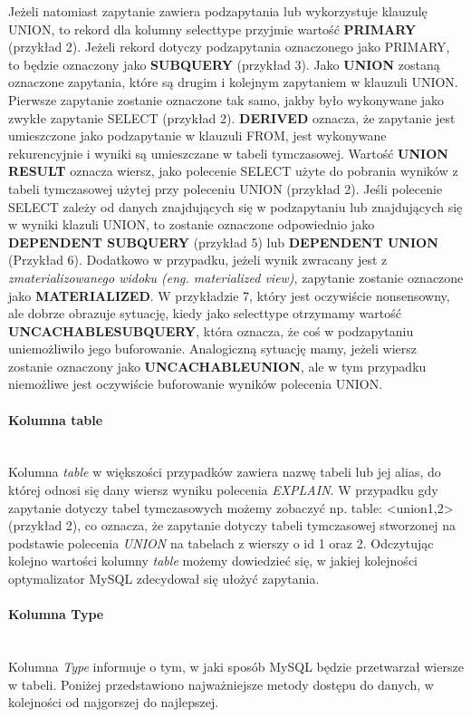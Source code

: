 Jeżeli natomiast zapytanie zawiera podzapytania lub wykorzystuje klauzulę UNION, to rekord dla kolumny select\textunderscore type przyjmie wartość \textbf{PRIMARY} (przykład 2). Jeżeli rekord dotyczy podzapytania oznaczonego jako PRIMARY, to będzie oznaczony jako \textbf{SUBQUERY} (przykład 3). Jako \textbf{UNION} zostaną oznaczone zapytania, które są drugim i kolejnym zapytaniem w klauzuli UNION. Pierwsze zapytanie zostanie oznaczone tak samo, jakby było wykonywane jako zwykłe zapytanie SELECT (przykład 2). \textbf{DERIVED} oznacza, że zapytanie jest umieszczone jako podzapytanie w klauzuli FROM, jest wykonywane rekurencyjnie i wyniki są umieszczane w tabeli tymczasowej. Wartość \textbf{UNION RESULT} oznacza wiersz, jako polecenie SELECT użyte do pobrania wyników z tabeli tymczasowej użytej przy poleceniu UNION (przykład 2). Jeśli polecenie SELECT zależy od danych znajdujących się w podzapytaniu lub znajdujących się w wyniki klazuli UNION, to zostanie oznaczone odpowiednio jako \textbf{DEPENDENT SUBQUERY} (przykład 5) lub \textbf{DEPENDENT UNION} (Przykład 6). Dodatkowo w przypadku, jeżeli wynik zwracany jest z \textit{zmaterializowanego widoku (eng. materialized view)}, zapytanie zostanie oznaczone jako \textbf{MATERIALIZED}. W przykładzie 7, który jest oczywiście nonsensowny, ale dobrze obrazuje sytuację, kiedy jako select\textunderscore type otrzymamy wartość \textbf{UNCACHABLE\textunderscore SUBQUERY}, która oznacza, że coś w podzapytaniu uniemożliwiło jego buforowanie. Analogiczną sytuację mamy, jeżeli wiersz zostanie oznaczony jako \textbf{UNCACHABLE\textunderscore UNION}, ale w tym przypadku niemożliwe jest oczywiście buforowanie wyników polecenia UNION.

\paragraph{Kolumna table}\leavevmode\\
Kolumna \textit{table} w większości przypadków zawiera nazwę tabeli lub jej alias, do której odnosi się dany wiersz wyniku polecenia \textit{EXPLAIN}. W przypadku gdy zapytanie dotyczy tabel tymczasowych możemy zobaczyć np. table: <union1,2> (przykład 2), co oznacza, że zapytanie dotyczy tabeli tymczasowej stworzonej na podstawie polecenia \textit{UNION} na tabelach z wierszy o id 1 oraz 2.
Odczytując kolejno wartości kolumny \textit{table} możemy dowiedzieć się, w jakiej kolejności optymalizator MySQL zdecydował się ułożyć zapytania. 

\paragraph{Kolumna Type}\leavevmode\\
Kolumna \textit{Type} informuje o tym, w jaki sposób MySQL będzie przetwarzał wiersze w tabeli. Poniżej przedstawiono najważniejsze metody dostępu do danych, w kolejności od najgorszej do najlepszej.

